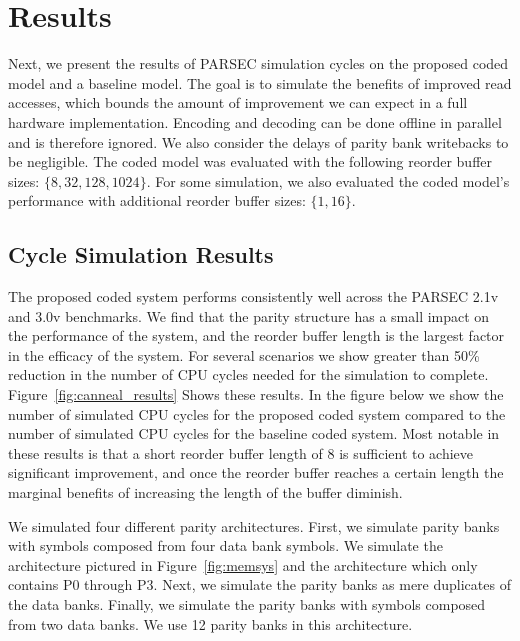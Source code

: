   \section{Results}
\label{sec:results}

Next, we present the results of PARSEC simulation cycles on the proposed coded model and a baseline model. The goal is to simulate the benefits of improved read accesses, which bounds the amount of improvement we can expect in a full hardware implementation. Encoding and decoding can be done offline in parallel and is therefore ignored. We also consider the delays of parity bank writebacks to be negligible. The coded model was evaluated with the following reorder buffer sizes: $\{8,32,128,1024\}$. For some simulation, we also evaluated the coded model's performance with additional reorder buffer sizes: $\{1, 16\}$.
\subsection{Cycle Simulation Results}
\label{sec:results}

The proposed coded system performs consistently well across the PARSEC 2.1v and 3.0v benchmarks. We find that the parity structure has a small impact on the performance of the system, and the reorder buffer length is  the largest factor in the efficacy of the system. For several scenarios we show greater than 50\% reduction in the number of CPU cycles needed for the simulation to complete. Figure~\ref{fig:canneal_results} Shows these results. In the figure below we show the number of simulated CPU cycles for the proposed coded system compared to the number of simulated CPU cycles for the baseline coded system. Most notable in these results is that a short reorder buffer length of 8 is sufficient to achieve significant improvement, and once the reorder buffer reaches a certain length the marginal benefits of increasing the length of the buffer diminish.

We simulated four different parity architectures. First, we simulate parity banks with symbols composed from four data bank symbols. We simulate the architecture pictured in Figure~\ref{fig:memsys} and the architecture which only contains P0 through P3. Next, we simulate the parity banks as mere duplicates of the data banks. Finally, we simulate the parity banks with symbols composed from two data banks. We use 12 parity banks in this architecture. 


